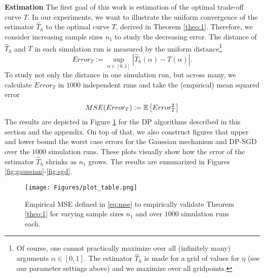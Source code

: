 \noindent \textbf{Estimation}
The first goal of this work is estimation of the optimal trade-off curve $T$. In our experiments, we want to illustrate the uniform convergence of the estimator $\hat T_h$ to the optimal curve $T$, derived in Theorem \ref{theo:1}. Therefore, we consider increasing sample sizes $n_1$ to study the decreasing error. The distance of $\hat T_h$ and $T$ in each simulation run is measured by the  uniform distance\footnote{Of course, one cannot practically maximize over all (infinitely many) arguments $\alpha \in [0,1]$. The estimator $\hat T_h$ is made for a grid of values for $\eta$ (see our parameter settings above) and we maximize over all gridpoints.} %
\[
    Error_T:=\sup_{\alpha \in [0,1]}|\hat T_h(\alpha)-T(\alpha)|.
\]
To study not only the distance in one simulation run, but across many, we calculate $Error_T$ in $1000$ independent runs and take the (empirical) mean squared error
\begin{equation}\label{eq:mse}
    MSE(Error_T):= \mathbb{E} \left[ Error_T^2 \right ]
\end{equation}
The results are depicted in Figure \ref{fig:estimation_mse} for the DP algorithms described in this section and the appendix. On top of that, we also construct figures that upper and lower bound the worst case errors for the Gaussian mechanism and DP-SGD over the $1000$ simulation runs. These plots visually show how the error of the estimator $\hat T_h$ shrinks as $n_1$ grows. 
The results are summarized in Figures \ref{fig:gaussian}-\ref{fig:sgd}.\\
\begin{figure}
\centering\texttt{[image: Figures/plot\_table.png]}
    \caption{\centering
    Empirical MSE defined in \eqref{eq:mse} to empirically validate Theorem \ref{theo:1} for varying sample sizes $n_1$ and over $1000$ simulation runs each.}\label{fig:estimation_mse}
\end{figure}

